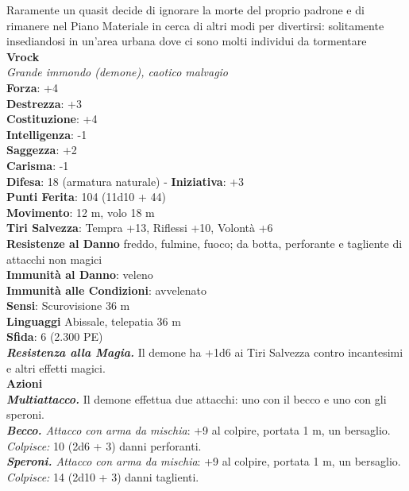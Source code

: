 \begin{multicols}{2}
Raramente un quasit decide di ignorare la morte del proprio padrone e di rimanere nel Piano Materiale in cerca di altri modi per divertirsi: solitamente insediandosi in un'area urbana dove ci sono molti individui da tormentare\\

\medskip\textbf{Vrock}\\
\emph{Grande immondo (demone), caotico malvagio}\\
\textbf{Forza}: +4\\
\textbf{Destrezza}: +3\\
\textbf{Costituzione}: +4\\
\textbf{Intelligenza}: -1\\
\textbf{Saggezza}: +2\\
\textbf{Carisma}: -1\\
\textbf{Difesa}: 18 (armatura naturale) - \textbf{Iniziativa}: +3\\
\textbf{Punti Ferita}: 104 (11d10 + 44)\\
\textbf{Movimento}: 12 m, volo 18 m\\
\textbf{Tiri Salvezza}: Tempra +13, Riflessi +10, Volontà +6\\
\textbf{Resistenze al Danno} freddo, fulmine, fuoco; da botta, perforante e tagliente di attacchi non magici\\
\textbf{Immunità al Danno}: veleno\\
\textbf{Immunità alle Condizioni}: avvelenato\\
\textbf{Sensi}: Scurovisione 36 m \\
\textbf{Linguaggi} Abissale, telepatia 36 m \\
\textbf{Sfida}: 6 (2.300 PE)\smallskip\\
\emph{\textbf{Resistenza alla Magia.}} Il demone ha +1d6 ai Tiri Salvezza contro incantesimi e altri effetti magici.\\
\smallskip\textbf{Azioni}\\
\emph{\textbf{Multiattacco.}} Il demone effettua due attacchi: uno con il becco e uno con gli speroni.\\
\emph{\textbf{Becco.} Attacco con arma da mischia}: +9 al colpire, portata 1 m, un bersaglio.\\
\emph{Colpisce:} 10 (2d6 + 3) danni perforanti.\\
\emph{\textbf{Speroni.} Attacco con arma da mischia}: +9 al colpire, portata 1 m, un bersaglio.\\
\emph{Colpisce:} 14 (2d10 + 3) danni taglienti.\\

\end{multicols}
